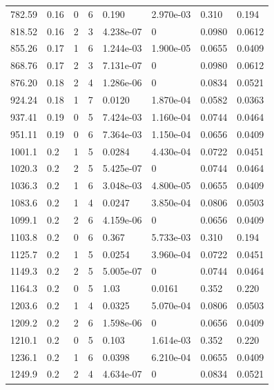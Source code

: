 \documentclass[preview]{standalone}
\begin{document}
{{{\begin{tabular}{L{1.2cm}C{1.2cm} C{0.3cm}C{0.5cm} C{1.4cm}C{1.4cm} C{1.4cm}C{1.4cm}}
  782.59  &  0.16  & 0     &  6 &  0.190  & 2.970e-03  & 0.310 &  0.194   \\ 
  818.52  &  0.16  & 2     &  3 &  4.238e-07  & 0  & 0.0980 &  0.0612   \\ 
  855.26  &  0.17  & 1     &  6 &  1.244e-03  & 1.900e-05  & 0.0655 &  0.0409   \\ 
  868.76  &  0.17  & 2     &  3 &  7.131e-07  & 0  & 0.0980 &  0.0612   \\ 
  876.20  &  0.18  & 2     &  4 &  1.286e-06  & 0  & 0.0834 &  0.0521   \\ 
  924.24  &  0.18  & 1     &  7 &  0.0120  & 1.870e-04  & 0.0582 &  0.0363   \\ 
  937.41  &  0.19  & 0     &  5 &  7.424e-03  & 1.160e-04  & 0.0744 &  0.0464   \\ 
  951.11  &  0.19  & 0     &  6 &  7.364e-03  & 1.150e-04  & 0.0656 &  0.0409   \\ 
  1001.1  &   0.2  & 1     &  5 &  0.0284  & 4.430e-04  & 0.0722 &  0.0451   \\ 
  1020.3  &   0.2  & 2     &  5 &  5.425e-07  & 0  & 0.0744 &  0.0464   \\ 
  1036.3  &   0.2  & 1     &  6 &  3.048e-03  & 4.800e-05  & 0.0655 &  0.0409   \\ 
  1083.6  &   0.2  & 1     &  4 &  0.0247  & 3.850e-04  & 0.0806 &  0.0503   \\ 
  1099.1  &   0.2  & 2     &  6 &  4.159e-06  & 0  & 0.0656 &  0.0409   \\ 
  1103.8  &   0.2  & 0     &  6 &  0.367  & 5.733e-03  & 0.310 &  0.194   \\ 
  1125.7  &   0.2  & 1     &  5 &  0.0254  & 3.960e-04  & 0.0722 &  0.0451   \\ 
  1149.3  &   0.2  & 2     &  5 &  5.005e-07  & 0  & 0.0744 &  0.0464   \\ 
  1164.3  &   0.2  & 0     &  5 &  1.03  & 0.0161  & 0.352 &  0.220   \\ 
  1203.6  &   0.2  & 1     &  4 &  0.0325  & 5.070e-04  & 0.0806 &  0.0503   \\ 
  1209.2  &   0.2  & 2     &  6 &  1.598e-06  & 0  & 0.0656 &  0.0409   \\ 
  1210.1  &   0.2  & 0     &  5 &  0.103  & 1.614e-03  & 0.352 &  0.220   \\ 
  1236.1  &   0.2  & 1     &  6 &  0.0398  & 6.210e-04  & 0.0655 &  0.0409   \\ 
  1249.9  &   0.2  & 2     &  4 &  4.634e-07  & 0  & 0.0834 &  0.0521   \\ 

\end{tabular}}}}
\end{document}
